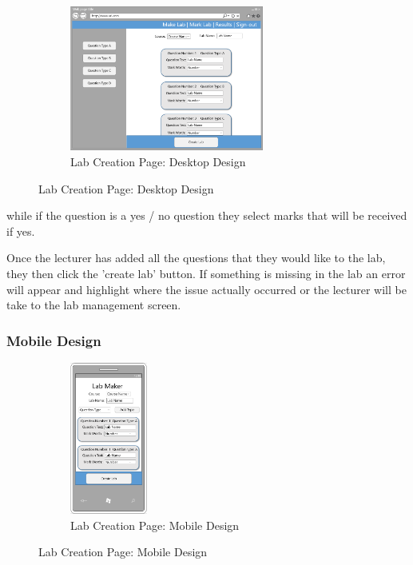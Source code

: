 \documentclass[12pt]{article}  %
\begin{document}
\begin{figure}
\vspace*{-\baselineskip}
\begin{figure}[H]
    \centering
    \includegraphics[width=0.7\textwidth]{images/design/maker-desktop.png}
    \caption{Lab Creation Page: Desktop Design}
    \label{fig:design-maker-pc}
\end{figure}
\end{figure}

\noindent while if the question is a yes / no question they select marks that will be received if yes. 

Once the lecturer has added all the questions that they would like to the lab, they then click the 'create lab' button. If something is missing in the lab an error will appear and highlight where the issue actually  occurred or the lecturer will be take to the lab management screen.


\subsubsection*{Mobile Design}

\begin{figure}
\vspace*{-\baselineskip}
\begin{figure}[H]
    \centering
    \includegraphics[width=0.28\textwidth]{images/design/maker-mobile.png}
    \caption{Lab Creation Page: Mobile Design}
    \label{fig:design-maker-mb}
\end{figure}
\end{figure}
\end{document}
